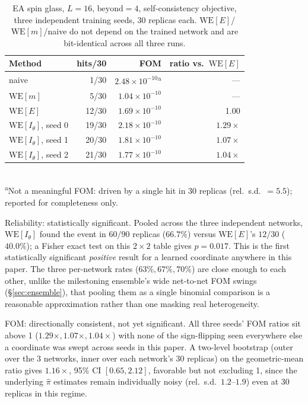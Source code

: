\documentclass[11pt]{article}
\begin{document}
	\begin{table}[h]
		\centering\small
		\caption{EA spin glass, $L=16$, $\mathrm{beyond}=4$, self-consistency objective,
			three independent training seeds, 30 replicas each. $\mathrm{WE}[E]$/$\mathrm{WE}[m]$/naive
			do not depend on the trained network and are bit-identical across all three runs.}
		\label{tab:selfconsistdeep}
		\begin{tabular}{lrrr}
			\toprule
			Method & hits/30 & FOM & ratio vs.\ $\mathrm{WE}[E]$ \\
			\midrule
			naive & 1/30 & $2.48\times10^{-10}$\textsuperscript{a} & --- \\
			$\mathrm{WE}[m]$ & 5/30 & $1.04\times10^{-10}$ & --- \\
			$\mathrm{WE}[E]$ & 12/30 & $1.69\times10^{-10}$ & 1.00 \\
			$\mathrm{WE}[I_\theta]$, seed 0 & 19/30 & $2.18\times10^{-10}$ & $1.29\times$ \\
			$\mathrm{WE}[I_\theta]$, seed 1 & 20/30 & $1.81\times10^{-10}$ & $1.07\times$ \\
			$\mathrm{WE}[I_\theta]$, seed 2 & 21/30 & $1.77\times10^{-10}$ & $1.04\times$ \\
			\bottomrule
		\end{tabular}
		\\[2pt]
		{\footnotesize\textsuperscript{a}Not a meaningful FOM: driven by a single hit in 30
			replicas (rel.\ s.d.\ $=5.5$); reported for completeness only.}
	\end{table}

	Reliability: statistically significant. Pooled across the three independent
	networks, $\mathrm{WE}[I_\theta]$ found the event in $60/90$ replicas ($66.7\%$) versus
	$\mathrm{WE}[E]$'s $12/30$ ($40.0\%$); a Fisher exact test on this $2\times2$ table gives
	$p=0.017$. This is the first statistically significant \emph{positive} result for a
	learned coordinate anywhere in this paper. The three per-network rates ($63\%, 67\%,
	70\%$) are close enough to each other, unlike the milestoning ensemble's wide
	net-to-net FOM swings (\S\ref{sec:ensemble}), that pooling them as a single binomial
	comparison is a reasonable approximation rather than one masking real heterogeneity.

	FOM: directionally consistent, not yet significant. All three seeds' FOM
	ratios sit above 1 ($1.29\times, 1.07\times, 1.04\times$) with none of the sign-flipping
	seen everywhere else a coordinate was swept across seeds in this paper. A two-level
	bootstrap (outer over the 3 networks, inner over each network's 30 replicas) on the
	geometric-mean ratio gives $1.16\times$, 95\% CI $[0.65, 2.12]$, favorable but not
	excluding 1, since the underlying $\hat\pi$ estimates remain individually noisy
	(rel.\ s.d.\ $1.2$--$1.9$) even at 30 replicas in this regime.
\end{document}
